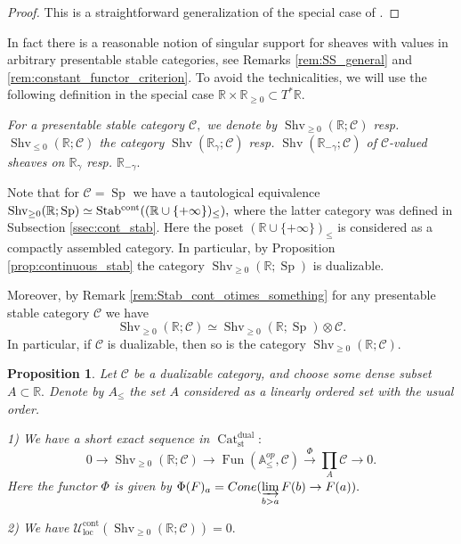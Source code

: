 \documentclass[11pt,leqno]{amsart}
\newtheorem{prop}[theo]{Proposition}
\numberwithin{equation}{section}
\def\A{{\mathbb A}}
\def\R{\mathbb{R}}
\newcommand{\indlim}[1][]{\mathop{\varinjlim}\limits_{#1}}
\newcommand{\prodd}[1][]{\mathop{\prod}\limits_{#1}}
\newcommand{\xto}{\xrightarrow}
\newcommand{\Cat}{\operatorname{Cat}}
\newcommand{\loc}{\operatorname{loc}}
\newcommand{\cont}{\operatorname{cont}}
\newcommand{\st}{\operatorname{st}}
\newcommand{\dual}{\operatorname{dual}}
\newcommand{\cC}{{\mathcal C}}
\newcommand{\cU}{{\mathcal U}}
\newcommand{\Fun}{\operatorname{Fun}}
\newcommand{\Sh}{\operatorname{Shv}}
\newcommand{\Sp}{\operatorname{Sp}}
\newcommand{\Stab}{\rm Stab}
\begin{document}
\begin{proof}This is a straightforward generalization of the special case of \cite[Theorem 2.5]{KS18}.\end{proof}

In fact there is a reasonable notion of singular support for sheaves with values in arbitrary presentable stable categories, see Remarks \ref{rem:SS_general} and \ref{rem:constant_functor_criterion}. To avoid the technicalities, we will use the following definition in the special case $\R\times\R_{\geq 0}\subset T^*\R.$ 

{} {\it For a presentable stable category $\cC,$ we denote by $\Sh_{\geq 0}(\R;\cC)$ resp. $\Sh_{\leq 0}(\R;\cC)$ the category $\Sh(\R_{\gamma};\cC)$ resp.  $\Sh(\R_{-\gamma};\cC)$ of $\cC$-valued sheaves on $\R_{\gamma}$ resp. $\R_{-\gamma}.$}

Note that for $\cC=\Sp$ we have a tautological equivalence $\Sh_{\geq 0}(\R;\Sp)\simeq \Stab^{\cont}((\R\cup\{+\infty\})_{\leq}),$ where the latter category was defined in Subsection \ref{ssec:cont_stab}. Here the poset $(\R\cup\{+\infty\})_{\leq}$ is considered as a compactly assembled category. In particular, by Proposition \ref{prop:continuous_stab} the category $\Sh_{\geq 0}(\R;\Sp)$ is dualizable.

 Moreover, by Remark \ref{rem:Stab_cont_otimes_something} for any presentable stable category $\cC$ we have 
\begin{equation}\label{eq:sheaves_otimes_something}\Sh_{\geq 0}(\R;\cC)\simeq\Sh_{\geq 0}(\R;\Sp)\otimes\cC.\end{equation}
In particular, if $\cC$ is dualizable, then so is the category $\Sh_{\geq 0}(\R;\cC).$


\begin{prop}\label{prop:resolution_of_Sh_geq_0} Let $\cC$ be a dualizable category, and choose some dense subset $A\subset\R.$ Denote by $A_{\leq}$ the set $A$ considered as a linearly ordered set with the usual order.

1) We have a short exact sequence in $\Cat_{\st}^{\dual}:$
\begin{equation}\label{eq:ses_for_Sh_geq_0} 0\to\Sh_{\geq 0}(\R;\cC)\to\Fun(\A_{\leq}^{op},\cC)\xto{\Phi}\prodd[A]\cC\to 0.\end{equation}
Here the functor $\Phi$ is given by $\Phi(F)_a=Cone(\indlim[b>a]F(b)\to F(a)).$

2) We have $\cU_{\loc}^{\cont}(\Sh_{\geq 0}(\R;\cC))=0.$\end{prop}
\end{document}
